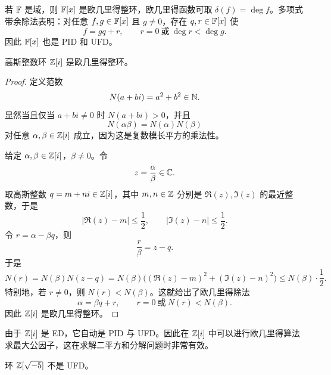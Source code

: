 \begin{example}
若 $\mathbb{F}$ 是域，则 $\mathbb{F}[x]$ 是欧几里得整环，欧几里得函数可取 $\delta(f)=\deg f$。多项式带余除法表明：对任意 $f,g\in\mathbb{F}[x]$ 且 $g\neq 0$，存在 $q,r\in\mathbb{F}[x]$ 使
\[
f=gq+r,
\qquad r=0\ \text{或}\ \deg r<\deg g.
\]
因此 $\mathbb{F}[x]$ 也是 PID 和 UFD。
\end{example}

\begin{theorem}
高斯整数环 $\mathbb{Z}[i]$ 是欧几里得整环。
\end{theorem}

\begin{proof}
定义范数
\[
N(a+bi)=a^2+b^2\in \mathbb{N}.
\]
显然当且仅当 $a+bi\neq 0$ 时 $N(a+bi)>0$，并且
\[
N(\alpha\beta)=N(\alpha)N(\beta)
\]
对任意 $\alpha,\beta\in\mathbb{Z}[i]$ 成立，因为这是复数模长平方的乘法性。

给定 $\alpha,\beta\in\mathbb{Z}[i]$，$\beta\neq 0$。令
\[
z=\frac{\alpha}{\beta}\in \mathbb{C}.
\]
取高斯整数 $q=m+ni\in\mathbb{Z}[i]$，其中 $m,n\in\mathbb{Z}$ 分别是 $\Re(z),\Im(z)$ 的最近整数，于是
\[
|\Re(z)-m|\le \frac12,
\qquad
|\Im(z)-n|\le \frac12.
\]
令 $r=\alpha-\beta q$，则
\[
\frac{r}{\beta}=z-q.
\]
于是
\[
N(r)=N(\beta)N(z-q)
= N(\beta)\bigl((\Re(z)-m)^2+(\Im(z)-n)^2\bigr)
\le N(\beta)\cdot \frac12.
\]
特别地，若 $r\neq 0$，则 $N(r)<N(\beta)$。这就给出了欧几里得除法
\[
\alpha=\beta q+r,
\qquad r=0\ \text{或}\ N(r)<N(\beta).
\]
因此 $\mathbb{Z}[i]$ 是欧几里得整环。
\end{proof}

\begin{remark}
由于 $\mathbb{Z}[i]$ 是 ED，它自动是 PID 与 UFD。因此在 $\mathbb{Z}[i]$ 中可以进行欧几里得算法求最大公因子，这在求解二平方和分解问题时非常有效。
\end{remark}

\begin{proposition}
环 $\mathbb{Z}[\sqrt{-5}]$ 不是 UFD。
\end{proposition}

